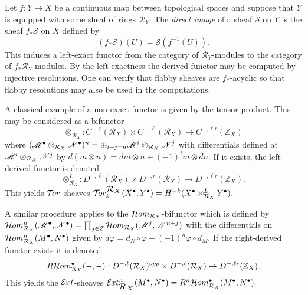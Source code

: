 Let $f:Y\to X$ be a continuous map between topological spaces and suppose that $Y$ is equipped with some sheaf of rings $\mathcal{R}_Y$.
The {\it direct image} of a sheaf $\mathcal{S}$ on $Y$ is the sheaf $f_*\mathcal{S}$ on $X$ defined by
$$(f_*\mathcal{S})(U) = \mathcal{S}(f^{-1}(U)).$$
This induces a left-exact functor from the category of $\mathcal{R}_Y$-modules to the category of $f_*\mathcal{R}_Y$-modules.
By the left-exactness the derived functor may be computed by injective resolutions.
One can verify that flabby sheaves are $f_*$-acyclic so that flabby resolutions may also be used in the computations.

A classical example of a non-exact functor is given by the tensor product.
This may be considered as a bifunctor
$$ \otimes_{\mathcal{R}_X} : C^{-,r}(\mathcal{R}_X)\times C^{-,\ell}(\mathcal{R}_X)\to C^{-,\ell r}(\mathbb{Z}_{X})$$
where
$(\mathscr{M}^\bullet \otimes_{\mathcal{R}_X} \mathscr{N}^\bullet)^n = \oplus_{i + j = n} \mathscr{M}^i \otimes_{\mathcal{R}_X} \mathscr{N}^j $
with differentials defined at $\mathscr{M}^i \otimes_{\mathcal{R}_X} \mathscr{N}^j$ by
$d(m\otimes n) = dm \otimes n + (-1)^i m \otimes dn.$
If it exists, the left-derived functor is denoted
$$ \otimes_{\mathcal{R}_X}^L : D^{-,\ell}(\mathcal{R}_X)\times D^{-,r}(\mathcal{R}_X)\to D^{-,\ell r}(\mathbb{Z}_X).$$
This yields $\mathcal{T}\mkern -3mu or$-sheaves
$\Tr{\mathcal{R}_X}{k}(X^\bullet, Y^\bullet) = H^{-k}(X^\bullet\otimes_{\mathcal{R}_X}^L Y^\bullet).$

A similar procedure applies to the $\mathcal{H}om_{\mathcal{R}_X}$-bifunctor which is defined by
$\mathcal{H}om_{\mathcal{R}_X}^n(\mathscr{M}^\bullet, \mathscr{N}^\bullet) \allowbreak = \prod_{j\in Z} \mathcal{H}om_{\mathcal{R}_X}(\mathscr{M}^j , \mathscr{N}^{n+j}) $
with the differentials on $\mathcal{H}om_{\mathcal{R}_X}^n(M^\bullet,N^\bullet)$ given by $d\varphi = d_N\circ \varphi - (-1)^n \varphi \circ d_M$.
If the right-derived functor exists it is denoted
$$R\mathcal{H}om_{\mathcal{R}_X}^\bullet({-},{-}): D^{-,\ell}(\mathcal{R}_X)^{opp}\times D^{+,\ell}(\mathcal{R}_X)\to D^{-,\ell r}(\mathbb{Z}_X).$$
This yields the $\mathcal{E}\mkern -1mu xt$-sheaves
$\Ex{\mathcal{R}_X}{n}(M^\bullet,N^\bullet) =  R^n\Hom_{\mathcal{R}_X}^\bullet(M^\bullet, N^\bullet).$
